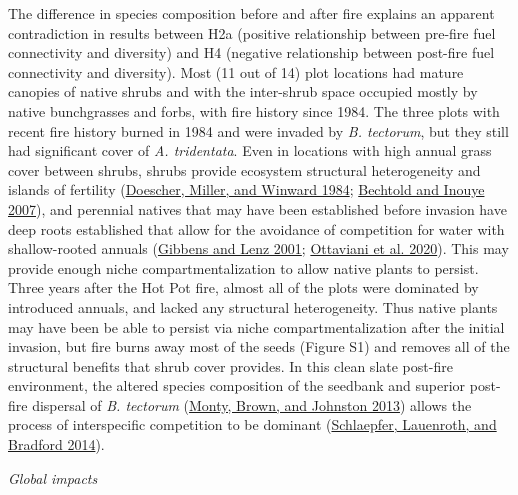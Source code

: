\documentclass[
  12pt,
]{article}
\begin{document}
The difference in species composition before and after fire explains an
apparent contradiction in results between H2a (positive relationship
between pre-fire fuel connectivity and diversity) and H4 (negative
relationship between post-fire fuel connectivity and diversity). Most
(11 out of 14) plot locations had mature canopies of native shrubs and
with the inter-shrub space occupied mostly by native bunchgrasses and
forbs, with fire history since 1984. The three plots with recent fire
history burned in 1984 and were invaded by \emph{B. tectorum}, but they
still had significant cover of \emph{A. tridentata}. Even in locations
with high annual grass cover between shrubs, shrubs provide ecosystem
structural heterogeneity and islands of fertility
(\protect\hyperlink{ref-Doescher1984}{Doescher, Miller, and Winward
1984}; \protect\hyperlink{ref-Bechtold2007}{Bechtold and Inouye 2007}),
and perennial natives that may have been established before invasion
have deep roots established that allow for the avoidance of competition
for water with shallow-rooted annuals
(\protect\hyperlink{ref-Gibbens2001}{Gibbens and Lenz 2001};
\protect\hyperlink{ref-Ottaviani2020}{Ottaviani et al. 2020}). This may
provide enough niche compartmentalization to allow native plants to
persist. Three years after the Hot Pot fire, almost all of the plots
were dominated by introduced annuals, and lacked any structural
heterogeneity. Thus native plants may have been be able to persist via
niche compartmentalization after the initial invasion, but fire burns
away most of the seeds (Figure S1) and removes all of the structural
benefits that shrub cover provides. In this clean slate post-fire
environment, the altered species composition of the seedbank and
superior post-fire dispersal of \emph{B. tectorum}
(\protect\hyperlink{ref-Monty2013}{Monty, Brown, and Johnston 2013})
allows the process of interspecific competition to be dominant
(\protect\hyperlink{ref-Schlaepfer2014}{Schlaepfer, Lauenroth, and
Bradford 2014}).

\emph{Global impacts}
\end{document}
